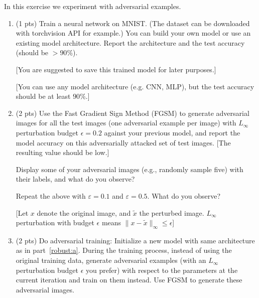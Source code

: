 \documentclass[10pt,letter,notitlepage]{article}
\newcounter{exercise}
\begin{document}
\begin{exercise}
	In this exercise we experiment with adversarial examples.

	\begin{enumerate}[label=\alph*)]


		\item (1 pts) Train a neural network on MNIST. (The dataset can be downloaded with torchvision API for example.) You can build your own model or use an existing model architecture. Report the architecture and the test accuracy (should be $>90\%$).

		[You are suggested to save this trained model for later purposes.]

		[You can use any model architecture (e.g. CNN, MLP), but the test accuracy should be at least $90\%$.]

      \label{robust:a}

  \item (2 pts) Use the Fast Gradient Sign Method (FGSM) to generate adversarial images for all the test images (one adversarial example per image) with $L_{\infty}$ perturbation budget $\epsilon = 0.2$ against your previous model, and report the model accuracy on this adversarially attacked set of test images. [The resulting value should be low.]

		Display some of your adversarial images (e.g., randomly sample five) with their labels, and what do you observe?

    Repeat the above with $\varepsilon = 0.1$ and $\varepsilon = 0.5$. What do you observe?


		[Let $x$ denote the original image, and $\tilde{x}$ the perturbed image. $L_{\infty}$ perturbation with budget $\epsilon$ means $\|x-\tilde{x}\|_{\infty} \leq \epsilon$]
      \label{robust:b}


    \item (2 pts) Do adversarial training: Initialize a new model with same architecture as in part~\ref{robust:a}. During the training process, instead of using the original training data, generate adversarial examples (with an $L_{\infty}$ perturbation budget $\epsilon$ you prefer) with respect to the parameters at the current iteration and train on them instead.
      Use FGSM to generate these adversarial images.


\end{enumerate}
\end{exercise}
\end{document}

